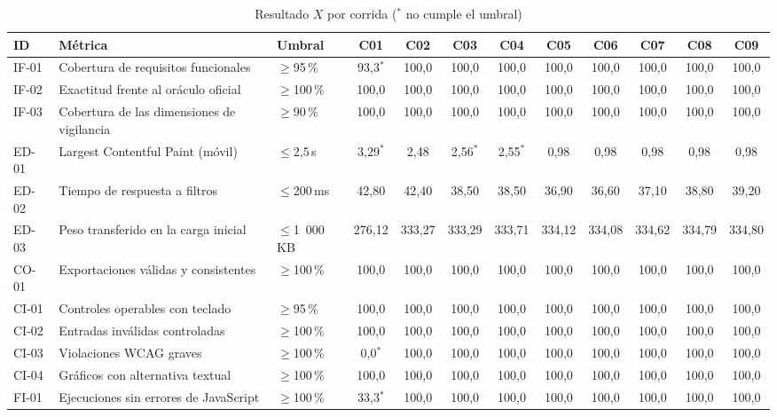 \documentclass[conference,a4paper]{IEEEtran}
\begin{document}
\begin{table}[t]
\caption{Resultado $X$ por corrida ($^{\ast}$ no cumple el umbral)}
\label{tab:res}
\centering\scriptsize
\setlength{\tabcolsep}{4pt}
\begin{tabular}{@{}lL{4.8cm}lccccccccc@{}}
\toprule
ID & Métrica & Umbral & C01 & C02 & C03 & C04 & C05 & C06 & C07 & C08 & C09 \\
\midrule
IF-01 & Cobertura de requisitos funcionales & $\geq$95\,\% & 93{,}3$^{\ast}$ & 100{,}0 & 100{,}0 & 100{,}0 & 100{,}0 & 100{,}0 & 100{,}0 & 100{,}0 & 100{,}0 \\
IF-02 & Exactitud frente al oráculo oficial & $\geq$100\,\% & 100{,}0 & 100{,}0 & 100{,}0 & 100{,}0 & 100{,}0 & 100{,}0 & 100{,}0 & 100{,}0 & 100{,}0 \\
IF-03 & Cobertura de las dimensiones de vigilancia & $\geq$90\,\% & 100{,}0 & 100{,}0 & 100{,}0 & 100{,}0 & 100{,}0 & 100{,}0 & 100{,}0 & 100{,}0 & 100{,}0 \\
ED-01 & Largest Contentful Paint (móvil) & $\leq$2{,}5\,s & 3{,}29$^{\ast}$ & 2{,}48 & 2{,}56$^{\ast}$ & 2{,}55$^{\ast}$ & 0{,}98 & 0{,}98 & 0{,}98 & 0{,}98 & 0{,}98 \\
ED-02 & Tiempo de respuesta a filtros & $\leq$200\,ms & 42{,}80 & 42{,}40 & 38{,}50 & 38{,}50 & 36{,}90 & 36{,}60 & 37{,}10 & 38{,}80 & 39{,}20 \\
ED-03 & Peso transferido en la carga inicial & $\leq$1~000\,KB & 276{,}12 & 333{,}27 & 333{,}29 & 333{,}71 & 334{,}12 & 334{,}08 & 334{,}62 & 334{,}79 & 334{,}80 \\
CO-01 & Exportaciones válidas y consistentes & $\geq$100\,\% & 100{,}0 & 100{,}0 & 100{,}0 & 100{,}0 & 100{,}0 & 100{,}0 & 100{,}0 & 100{,}0 & 100{,}0 \\
CI-01 & Controles operables con teclado & $\geq$95\,\% & 100{,}0 & 100{,}0 & 100{,}0 & 100{,}0 & 100{,}0 & 100{,}0 & 100{,}0 & 100{,}0 & 100{,}0 \\
CI-02 & Entradas inválidas controladas & $\geq$100\,\% & 100{,}0 & 100{,}0 & 100{,}0 & 100{,}0 & 100{,}0 & 100{,}0 & 100{,}0 & 100{,}0 & 100{,}0 \\
CI-03 & Violaciones WCAG graves & $\geq$100\,\% & 0{,}0$^{\ast}$ & 100{,}0 & 100{,}0 & 100{,}0 & 100{,}0 & 100{,}0 & 100{,}0 & 100{,}0 & 100{,}0 \\
CI-04 & Gráficos con alternativa textual & $\geq$100\,\% & 100{,}0 & 100{,}0 & 100{,}0 & 100{,}0 & 100{,}0 & 100{,}0 & 100{,}0 & 100{,}0 & 100{,}0 \\
FI-01 & Ejecuciones sin errores de JavaScript & $\geq$100\,\% & 33{,}3$^{\ast}$ & 100{,}0 & 100{,}0 & 100{,}0 & 100{,}0 & 100{,}0 & 100{,}0 & 100{,}0 & 100{,}0 \\

\end{tabular}
\end{table}
\end{document}
